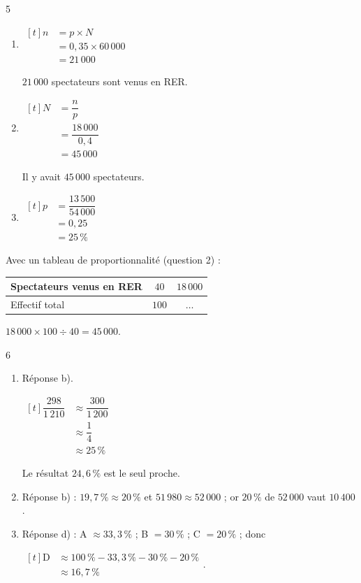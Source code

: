 \documentclass[10pt,a4paper]{article}
\begin{document}
\begin{corr}{5}
\begin{enumerate}[leftmargin=*]
    \item \(\begin{aligned}[t] n&=p\times N\\ &=0,35\times 60\,000\\ &=21\,000\end{aligned}\)

    \(21\,000\) spectateurs sont venus en RER.
    \item \(\begin{aligned}[t] N&=\dfrac{n}{p}\\ &=\dfrac{18\,000}{0,4}\\ &=45\,000\end{aligned}\)

    Il y avait \(45\,000\) spectateurs.
    \item \(\begin{aligned}[t] p&=\dfrac{13\,500}{54\,000}\\ &=0,25\\ &=25\,\%\end{aligned}\)
\end{enumerate}

\begin{rappel}
Avec un tableau de proportionnalité (question 2) :
\begin{center}
\renewcommand{\arraystretch}{1.5}
\begin{tabular}{|l|c|c|}
    \hline
    Spectateurs venus en RER & \(40\) & \(18\,000\) \\ \hline
    Effectif total & \(100\) & \(\dots\) \\ \hline
\end{tabular}
\end{center}
\(18\,000\times 100\div 40=45\,000\).
\end{rappel}
\end{corr}

\begin{corr}[QCM]{6}
\begin{enumerate}[leftmargin=*]
    \item Réponse b).

    \(\begin{aligned}[t] \dfrac{298}{1\,210}&\approx\dfrac{300}{1\,200}\\ &\approx\dfrac{1}{4}\\ &\approx 25\,\%\end{aligned}\)

    Le résultat \(24,6\,\%\) est le seul proche.
    \item Réponse b) : \(19,7\,\%\approx 20\,\%\) et \(51\,980\approx 52\,000\) ; or \(20\,\%\) de \(52\,000\) vaut \(10\,400\).
    \item Réponse d) : A \(\approx 33,3\,\%\) ; B \(=30\,\%\) ; C \(=20\,\%\) ; donc

    \(\begin{aligned}[t] \text{D}&\approx 100\,\%-33,3\,\%-30\,\%-20\,\%\\ &\approx 16,7\,\%\end{aligned}\).
\end{enumerate}
\end{corr}
\end{document}
